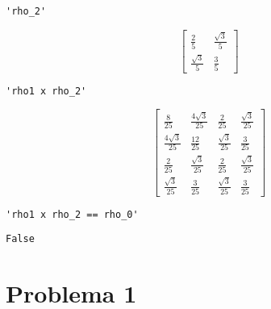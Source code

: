 \documentclass[11pt]{article}
\begin{document}
    
    
    \begin{verbatim}
'rho_2'
    \end{verbatim}

    
    $$\left[\begin{matrix}\frac{2}{5} & \frac{\sqrt{3}}{5}\\\frac{\sqrt{3}}{5} & \frac{3}{5}\end{matrix}\right]$$

    
    
    \begin{verbatim}
'rho1 x rho_2'
    \end{verbatim}

    
    $$\left[\begin{matrix}\frac{8}{25} & \frac{4 \sqrt{3}}{25} & \frac{2}{25} & \frac{\sqrt{3}}{25}\\\frac{4 \sqrt{3}}{25} & \frac{12}{25} & \frac{\sqrt{3}}{25} & \frac{3}{25}\\\frac{2}{25} & \frac{\sqrt{3}}{25} & \frac{2}{25} & \frac{\sqrt{3}}{25}\\\frac{\sqrt{3}}{25} & \frac{3}{25} & \frac{\sqrt{3}}{25} & \frac{3}{25}\end{matrix}\right]$$

    
    
    \begin{verbatim}
'rho1 x rho_2 == rho_0'
    \end{verbatim}

    
    
    \begin{verbatim}
False
    \end{verbatim}

    
    \hypertarget{problema-1}{%
\section{Problema 1}\label{problema-1}}
\end{document}
